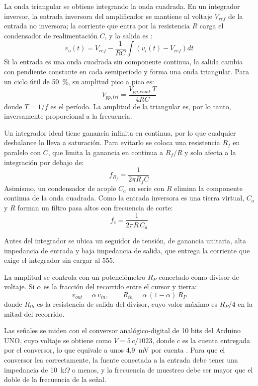 \documentclass[conference]{IEEEtran}
\begin{document}
La onda triangular se obtiene integrando la onda cuadrada. En un integrador inversor, la entrada inversora del amplificador se mantiene al voltaje $V_{ref}$ de la entrada no inversora; la corriente que entra por la resistencia $R$ carga el condensador de realimentación $C$, y la salida es \cite{sedra}:
\begin{equation}
v_o(t) = V_{ref} - \frac{1}{RC}\int \left(v_i(t)-V_{ref}\right)dt
\end{equation}
Si la entrada es una onda cuadrada sin componente continua, la salida cambia con pendiente constante en cada semiperíodo y forma una onda triangular. Para un ciclo útil de 50~\%, su amplitud pico a pico es:
\begin{equation}
V_{pp,tri} = \frac{V_{pp,cuad}\;T}{4RC}
\label{eq:tri}
\end{equation}
donde $T=1/f$ es el período. La amplitud de la triangular es, por lo tanto, inversamente proporcional a la frecuencia.

Un integrador ideal tiene ganancia infinita en continua, por lo que cualquier desbalance lo lleva a saturación. Para evitarlo se coloca una resistencia $R_f$ en paralelo con $C$, que limita la ganancia en continua a $R_f/R$ y solo afecta a la integración por debajo de:
\begin{equation}
f_{R_f} = \frac{1}{2\pi R_f C}
\end{equation}
Asimismo, un condensador de acople $C_a$ en serie con $R$ elimina la componente continua de la onda cuadrada. Como la entrada inversora es una tierra virtual, $C_a$ y $R$ forman un filtro pasa altos con frecuencia de corte:
\begin{equation}
f_c = \frac{1}{2\pi R\,C_a}
\end{equation}

Antes del integrador se ubica un seguidor de tensión, de ganancia unitaria, alta impedancia de entrada y baja impedancia de salida, que entrega la corriente que exige el integrador sin cargar al 555.

La amplitud se controla con un potenciómetro $R_P$ conectado como divisor de voltaje. Si $\alpha$ es la fracción del recorrido entre el cursor y tierra:
\begin{equation}
v_{out} = \alpha\,v_{in}, \qquad R_{th} = \alpha\,(1-\alpha)\,R_P
\end{equation}
donde $R_{th}$ es la resistencia de salida del divisor, cuyo valor máximo es $R_P/4$ en la mitad del recorrido.

Las señales se miden con el conversor analógico-digital de 10 bits del Arduino UNO, cuyo voltaje se obtiene como $V = 5\,c/1023$, donde $c$ es la cuenta entregada por el conversor, lo que equivale a unos 4,9~mV por cuenta \cite{atmega}. Para que el conversor lea correctamente, la fuente conectada a la entrada debe tener una impedancia de 10~k$\Omega$ o menos, y la frecuencia de muestreo debe ser mayor que el doble de la frecuencia de la señal.
\end{document}
